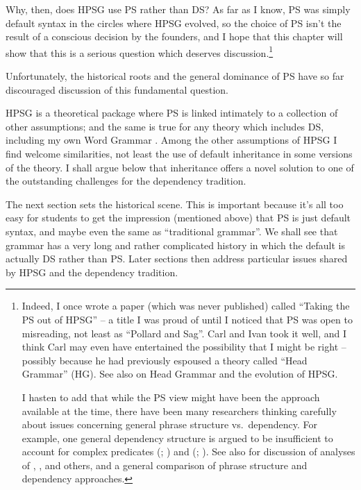 \documentclass[output=paper,biblatex,babelshorthands,newtxmath,draftmode,colorlinks,citecolor=brown]{langscibook}
\begin{document}
Why, then, does HPSG use PS rather than DS? As far as I know, PS was simply default syntax in the
circles where HPSG evolved, so the choice of PS isn't the result of a conscious decision by the
founders, and I hope that this chapter will show that this is a serious question which deserves
discussion.\footnote{%
  Indeed, I once wrote a paper (which was never published) called ``Taking the PS out of HPSG'' – a
  title I was proud of until I noticed that PS was open to misreading, not least as ``Pollard and
  Sag''. Carl and Ivan took it well, and I think Carl may even have entertained the possibility that
  I might be right – possibly because he had previously espoused a theory called ``Head Grammar''
  (HG). See also  on
    Head Grammar and the evolution of HPSG.

I hasten to add that while the PS view might have been the approach available at the time,
  there have been many researchers thinking carefully about issues concerning general phrase structure
  vs.\ dependency. For example, one general dependency structure is argued to be insufficient to
  account for complex predicates (\citealt{AG2010a-u}; ) and 
  (\citealt{KS2002a}; ). See also  for discussion of analyses of
  \citet{Eroms2000a}, \citet{GO2009a}, and others, and a general comparison of phrase structure and dependency approaches.
}


Unfortunately, the historical roots and the general dominance of PS have so far discouraged discussion of this fundamental question.

\largerpage
HPSG is a theoretical package where PS is linked intimately to a collection of other assumptions;
and the same is true for any theory which includes DS, including my own Word Grammar
\citep{Hudson84a-u,Hudson90a-u,Hudson1998,Hudson2007a-u,Hudson2010b-u,Gisborne2010,GisborneTBA,Duran-Eppler2011,TraugottTrousdale2013}. Among
the other assumptions of HPSG I find welcome similarities, not least the use of default inheritance
in some versions of the theory. I shall argue below that inheritance offers a novel solution to one
of the outstanding challenges for the dependency tradition.

The next section sets the historical scene. This is important because it's all too easy for students
to get the impression (mentioned above) that PS is just default syntax, and maybe even the same as
``traditional grammar''. We shall see that grammar has a very long and rather complicated history in
which the default is actually DS rather than PS. Later sections then address particular issues
shared by HPSG and the dependency tradition.
\end{document}
